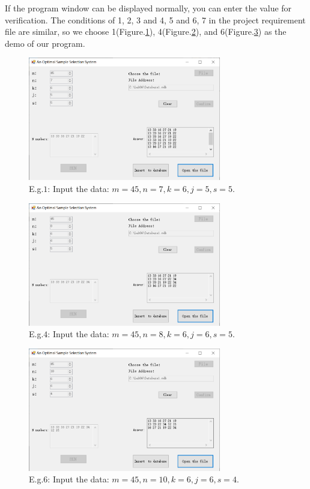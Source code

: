 If the program window can be displayed normally, you can enter the value for verification. The conditions of 1, 2, 3 and 4, 5 and 6, 7 in the project requirement file are similar, so we choose 1(Figure.\ref{fig:eg1}), 4(Figure.\ref{fig:eg4}), and 6(Figure.\ref{fig:eg6}) as the demo of our program.
\begin{figure}[!htbp]
	\centering
	\includegraphics[width=0.75\textwidth]{images/1.png}
	\caption{E.g.$1$: Input the data: $m=45, n=7, k=6, j=5, s=5.$}
	\label{fig:eg1}
\end{figure}
\begin{figure}[!htbp]
	\centering
	\includegraphics[width=0.75\textwidth]{images/4.png}
	\caption{E.g.$4$: Input the data: $m=45, n=8, k=6, j=6, s=5.$}
	\label{fig:eg4}
\end{figure}
\begin{figure}[!htbp]
	\centering
	\includegraphics[width=0.75\textwidth]{images/6.png}
	\caption{E.g.$6$: Input the data: $m=45, n=10, k=6, j=6, s=4.$}
	\label{fig:eg6}
\end{figure}

